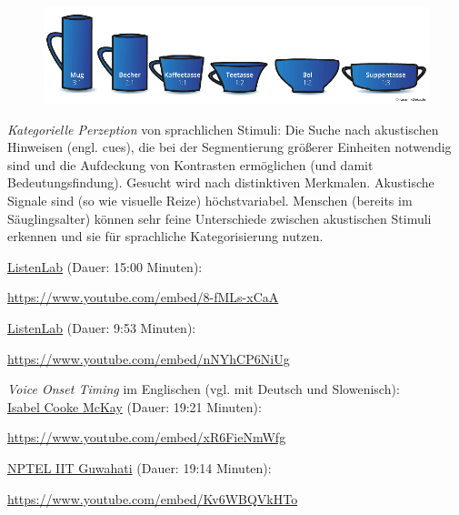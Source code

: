 \documentclass[
  letterpaper,
]{scrbook}
\begin{document}
\begin{figure}

{\centering 

\href{https://www.keramikdeko.de/blog/alles-ueber-keramiktassen-und-keramikbecher-b74.html}{\includegraphics[width=1\textwidth,height=\textheight]{./pictures/Arten_von_Tassen_800.png}}

}

\end{figure}

\emph{Kategorielle Perzeption} von sprachlichen Stimuli: Die Suche nach
akustischen Hinweisen (engl. cues), die bei der Segmentierung größerer
Einheiten notwendig sind und die Aufdeckung von Kontrasten ermöglichen
(und damit Bedeutungsfindung). Gesucht wird nach distinktiven Merkmalen.
Akustische Signale sind (so wie visuelle Reize) höchstvariabel. Menschen
(bereits im Säuglingsalter) können sehr feine Unterschiede zwischen
akustischen Stimuli erkennen und sie für sprachliche Kategorisierung
nutzen.

\href{https://www.youtube.com/watch?v=8-fMLs-xCaA}{ListenLab} (Dauer:
15:00 Minuten):

\url{https://www.youtube.com/embed/8-fMLs-xCaA}

\href{https://www.youtube.com/watch?v=nNYhCP6NiUg}{ListenLab} (Dauer:
9:53 Minuten):

\url{https://www.youtube.com/embed/nNYhCP6NiUg}

\emph{Voice Onset Timing} im Englischen (vgl. mit Deutsch und
Slowenisch):\\
\href{https://www.youtube.com/watch?v=xR6FieNmWfg}{Isabel Cooke McKay}
(Dauer: 19:21 Minuten):

\url{https://www.youtube.com/embed/xR6FieNmWfg}

\href{https://www.youtube.com/watch?v=Kv6WBQVkHTo}{NPTEL IIT Guwahati}
(Dauer: 19:14 Minuten):

\url{https://www.youtube.com/embed/Kv6WBQVkHTo}
\end{document}
